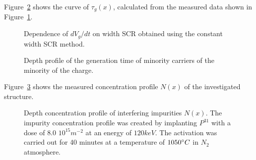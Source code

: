Figure~\ref{fig:3.6} shows the curve of $\tau_g(x)$, calculated
from the measured data shown in Figure~\ref{fig:3.5}.

\begin{figure}[h!]\centering
  
  \caption[Dependence of ${dV_g}/{dt}$ on SCR width obtained by
    constant SCR width method]{Dependence of ${dV_g}/{dt}$ on width
    SCR obtained using the constant width SCR method.}\label{fig:3.5}
\end{figure}

\begin{figure}[h!]\centering
  
  \caption[Depth profile of the generation lifetime of minority carriers
    charge]{Depth profile of the generation time of minority carriers
    of the minority of the charge.}\label{fig:3.6}
\end{figure}

Figure~\ref{fig:3.7} shows the measured concentration profile $N(x)$ of the investigated
structure.

\begin{figure}[h!]\centering
  
  \caption[Depth profile of concentration of interfering impurities
    $N(x)$]{Depth concentration profile of interfering impurities
    $N(x)$. The impurity concentration profile was created by implanting
    $P^{31}$ with a dose of $8.0$ $10^{15}m^{-2}$ at an energy of $120 keV$.
    The activation was carried out for 40 minutes at a temperature of $1050 \degree C$ in
    $N_2$ atmosphere.}\label{fig:3.7}
\end{figure}


